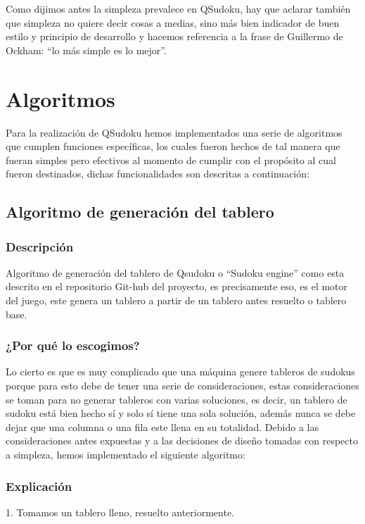 \documentclass[a4paper,11pt]{article}
\begin{document}
	Como dijimos antes la simpleza prevalece en QSudoku, hay que aclarar también que simpleza no quiere decir cosas a medias, sino más bien indicador de buen estilo y principio de desarrollo y hacemos referencia a la frase de Guillermo de Ockham: “lo más simple es lo mejor”.

\section{Algoritmos}
	Para la realización de QSudoku hemos implementados una serie de algoritmos que cumplen funciones específicas, los cuales fueron hechos de tal manera que fueran simples pero efectivos al momento de cumplir con el propósito al cual fueron destinados, dichas funcionalidades son descritas a continuación:

\subsection{Algoritmo de generación del tablero}
\subsubsection{Descripción}
Algoritmo de generación del tablero de Qsudoku o “Sudoku engine” como esta descrito en el repositorio Git-hub del proyecto, es precisamente eso, es el motor del juego, este genera un tablero a partir de un tablero antes resuelto o tablero base.

\subsubsection{¿Por qué lo escogimos?}
Lo cierto es que es muy complicado que una máquina genere tableros de sudokus porque para esto debe de tener una serie de consideraciones, estas consideraciones se toman para no generar tableros con varias soluciones, es decir, un tablero de sudoku está bien hecho sí y solo sí tiene una sola solución, además nunca se debe dejar que una columna o una fila este llena en su totalidad.
	Debido a las consideraciones antes expuestas y a las decisiones de diseño tomadas con respecto a simpleza, hemos implementado el siguiente algoritmo:

\subsubsection{Explicación}

1.	Tomamos un tablero lleno, resuelto anteriormente.
\end{document}
